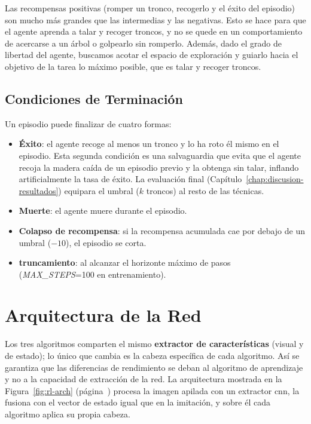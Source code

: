 Las recompensas positivas (romper un tronco, recogerlo y el éxito del episodio) son mucho más grandes que las intermedias y las negativas.
Esto se hace para que el agente aprenda a talar y recoger troncos, y no se quede en un comportamiento de acercarse a un árbol 
o golpearlo sin romperlo.
Además, dado el grado de libertad del agente, buscamos acotar el espacio de exploración y guiarlo hacia el objetivo de la tarea
lo máximo posible, que es talar y recoger troncos. 

\subsection{Condiciones de Terminación}
\label{sec:rl-terminacion}
Un episodio puede finalizar de cuatro formas:

\begin{itemize}
  \item \textbf{Éxito}: el agente recoge al menos un tronco y lo ha roto él
  mismo en el episodio. Esta segunda condición es una salvaguardia que evita que el agente
  recoja la madera caída de un episodio previo y la obtenga sin talar, inflando artificialmente la tasa de éxito.
  La evaluación final (Capítulo~\ref{chap:discusion-resultados}) equipara el umbral ($k$ troncos) al resto de las técnicas.
  \item \textbf{Muerte}: el agente muere durante el episodio.
  \item \textbf{Colapso de recompensa}: si la recompensa acumulada cae por debajo de un
  umbral ($-\num{10}$), el episodio se corta.
  \item \textbf{\Gls{truncamiento}}: al alcanzar el horizonte máximo de pasos
  (\textit{MAX\_STEPS}=\num{100} en entrenamiento).
\end{itemize}

\section{Arquitectura de la Red}
\label{sec:rl-arch}
Los tres algoritmos comparten el mismo \textbf{extractor de características} (visual y de
estado); lo único que cambia es la cabeza específica de cada algoritmo. Así se
garantiza que las diferencias de rendimiento se deban al algoritmo de aprendizaje y no a la
capacidad de extracción de la red. La arquitectura mostrada en la Figura~\ref{fig:rl-arch} (página~\pageref{fig:rl-arch})
procesa la imagen apilada con un extractor \gls{cnn}, la fusiona con el vector de estado igual que en la imitación, 
y sobre él cada algoritmo aplica su propia cabeza.

